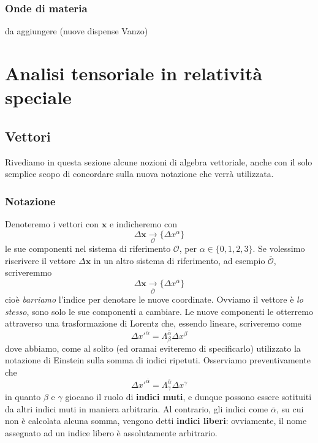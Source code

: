 \documentclass[a4paper,11pt]{book}
\theoremstyle{plain}
\theoremstyle{definition}
\begin{document}
\subsection{Onde di materia}
da aggiungere (nuove dispense Vanzo)
\chapter{Analisi tensoriale in relatività speciale}
\section{Vettori}
Rivediamo in questa sezione alcune nozioni di algebra vettoriale, anche con il solo semplice scopo di concordare sulla nuova notazione che verrà utilizzata. 

\subsection{Notazione}
Denoteremo i vettori con $\textbf{x}$ e indicheremo con
\[
\Delta\textbf{x}\underset{\mathcal{O}}{\to} \{\Delta x^{\alpha} \}
\]
le sue componenti nel sistema di riferimento $\mathcal{O}$, per $\alpha\in\{0,1,2,3\}$. Se volessimo riscrivere il vettore $\Delta \textbf{x}$ in un altro sistema di riferimento, ad esempio $\overline{\mathcal{O}}$, scriveremmo
\[
\Delta \textbf{x} \underset{\mathcal{\overline{O}}}{\to} \{ \Delta x^{\overline{\alpha}} \}
\]
cioè \emph{barriamo} l'indice per denotare le nuove coordinate. Ovviamo il vettore è \emph{lo stesso}, sono solo le sue componenti a cambiare. Le nuove componenti le otterremo attraverso una trasformazione di Lorentz che, essendo lineare, scriveremo come
\begin{equation}\label{eq:vec1}
\Delta x'^{\overline{\alpha}} = \Lambda _{\beta}^{\overline{\alpha}}\Delta x^{\beta}
\end{equation}
dove abbiamo, come al solito (ed oramai eviteremo di specificarlo) utilizzato la notazione di Einstein sulla somma di indici ripetuti. Osserviamo preventivamente che
\[
\Delta x'^{\overline{\alpha}} = \Lambda _{\gamma}^{\overline{\alpha}}\Delta x^{\gamma}
\]
in quanto $\beta$ e $\gamma$ giocano il ruolo di \textbf{indici muti}, e dunque possono essere sotituiti da altri indici muti in maniera arbitraria. Al contrario, gli indici come $\overline{\alpha}$, su cui non è calcolata alcuna somma, vengono detti \textbf{indici liberi}: ovviamente, il nome assegnato ad un indice libero è assolutamente arbitrario.
\end{document}
